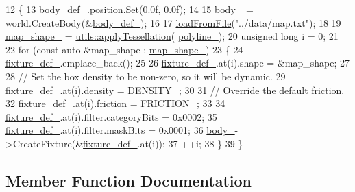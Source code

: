 \begin{DoxyCode}
12                        \{
13     \hyperlink{classMap_a1913e9e11e4e52ef5b71c31a41badfe9}{body\_def\_}.position.Set(0.0f, 0.0f);
14 
15     \hyperlink{classMap_a195872fd7eb8c84db43a75bf27a6a2f2}{body\_} = world.CreateBody(&\hyperlink{classMap_a1913e9e11e4e52ef5b71c31a41badfe9}{body\_def\_});
16 
17     \hyperlink{classMap_af2fd3dfd35ca7a85544a6c083e542f2f}{loadFromFile}(\textcolor{stringliteral}{"../data/map.txt"});
18 
19     \hyperlink{classMap_a831c5a01dc023fc32f11d267d693eec8}{map\_shape\_} = \hyperlink{namespaceutils_ad56cbd0c7a6e813a5dd523bbaabb55a4}{utils::applyTessellation}(
      \hyperlink{classMap_a6bb2e5bde1854c9ceb4ad7d0349aa878}{polyline\_});
20     \textcolor{keywordtype}{unsigned} \textcolor{keywordtype}{long} i = 0;
21 
22     \textcolor{keywordflow}{for} (\textcolor{keyword}{const} \textcolor{keyword}{auto} &map\_shape : \hyperlink{classMap_a831c5a01dc023fc32f11d267d693eec8}{map\_shape\_})
23     \{
24         \hyperlink{classMap_a4ca70bdb2efc0b2a59018280f8d63419}{fixture\_def\_}.emplace\_back();
25 
26         \hyperlink{classMap_a4ca70bdb2efc0b2a59018280f8d63419}{fixture\_def\_}.at(i).shape = &map\_shape;
27 
28         \textcolor{comment}{// Set the box density to be non-zero, so it will be dynamic.}
29         \hyperlink{classMap_a4ca70bdb2efc0b2a59018280f8d63419}{fixture\_def\_}.at(i).density = \hyperlink{classMap_a011ca799401c6fa3fa115ee223412a8c}{DENSITY\_};
30 
31         \textcolor{comment}{// Override the default friction.}
32         \hyperlink{classMap_a4ca70bdb2efc0b2a59018280f8d63419}{fixture\_def\_}.at(i).friction = \hyperlink{classMap_a16f21d5c0bb1ecd14d5d1ac20df1e101}{FRICTION\_};
33 
34         \hyperlink{classMap_a4ca70bdb2efc0b2a59018280f8d63419}{fixture\_def\_}.at(i).filter.categoryBits = 0x0002;
35         \hyperlink{classMap_a4ca70bdb2efc0b2a59018280f8d63419}{fixture\_def\_}.at(i).filter.maskBits = 0x0001;
36         \hyperlink{classMap_a195872fd7eb8c84db43a75bf27a6a2f2}{body\_}->CreateFixture(&\hyperlink{classMap_a4ca70bdb2efc0b2a59018280f8d63419}{fixture\_def\_}.at(i));
37         ++i;
38     \}
39 \}
\end{DoxyCode}


\subsection{Member Function Documentation}
\mbox{\label{classMap_a32d8cf8af3089a95e0471fd523050896}} 
